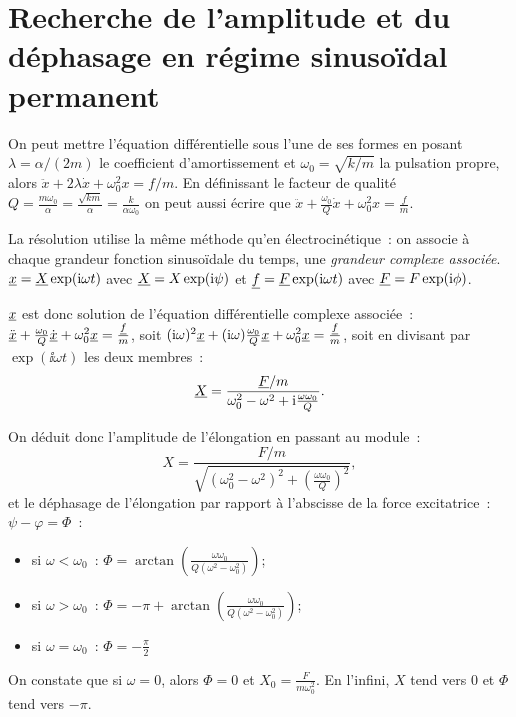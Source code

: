 \section{Recherche de l'amplitude et du déphasage en régime sinusoïdal permanent}
On peut mettre l'équation différentielle sous l'une de ses formes en posant \(\lambda = \alpha/(2m)\) le coefficient d'amortissement et \(\omega_0=\sqrt{k/m}\) la pulsation propre, alors \(\ddot{x}+2\lambda \dot{x}+\omega_0^2x = f/m\).
En définissant le facteur de qualité \(Q = \frac{m\omega_0}{\alpha}=\frac{\sqrt{km}}{\alpha}=\frac{k}{\alpha\omega_0}\) on peut aussi écrire que \(\ddot{x}+\frac{\omega_0}{Q}\dot{x}+\omega_0^2 x=\frac{f}{m}\).

La résolution utilise la même méthode qu'en électrocinétique~: on associe à chaque grandeur fonction sinusoïdale du temps, une \emph{grandeur complexe associée}.
\(\underline{x} = \underline{X}\exp(\mathrm{i}\omega t)\) avec \(\underline{X} = X\exp(\mathrm{i}\psi)\) et \(\underline{f} = \underline{F}\exp(\mathrm{i}\omega t)\) avec \(\underline{F} = F\exp(\mathrm{i}\phi)\).

\(\underline{x}\) est donc solution de l'équation différentielle complexe associée~: \(\ddot{\underline{x}}+\frac{\omega_0}{Q}\dot{\underline{x}}+\omega_0^2 \underline{x}=\frac{\underline{f}}{m}\), soit \((\mathrm{i}\omega)^2\underline{x} + (\mathrm{i}\omega)\frac{\omega_0}{Q}\underline{x}+\omega_0^2\underline{x} = \frac{\underline{f}}{m}\), soit en divisant par \(\exp(\ii\omega t)\) les deux membres~:
\begin{equation}
    \underline{X} = \frac{\underline{F}/m}{\omega_0^2-\omega^2+\mathrm{i}\frac{\omega\omega_0}{Q}}.
\end{equation}

On déduit donc l'amplitude de l'élongation en passant au module~:
\begin{equation}
    X = \frac{F/m}{\sqrt{(\omega_0^2-\omega^2)^2+\left(\frac{\omega\omega_0}{Q}\right)^2}},
\end{equation}
et le déphasage de l'élongation par rapport à l'abscisse de la force excitatrice~: \(\psi-\varphi = \Phi\)~: 
\begin{itemize}
    \item si \(\omega<\omega_0\)~: \(\Phi = \arctan(\frac{\omega\omega_0}{Q(\omega^2-\omega_0^2)})\);
    \item si \(\omega>\omega_0\)~: \(\Phi = -\pi + \arctan(\frac{\omega\omega_0}{Q(\omega^2-\omega_0^2)})\);
    \item si \(\omega=\omega_0\)~: \(\Phi = -\frac{\pi}{2}\)
\end{itemize}
On constate que si \(\omega = 0\), alors \(\Phi=0\) et \(X_0 = \frac{F}{m\omega_0^2}\). En l'infini, \(X\) tend vers 0 et \(\Phi\) tend vers \(-\pi\).

